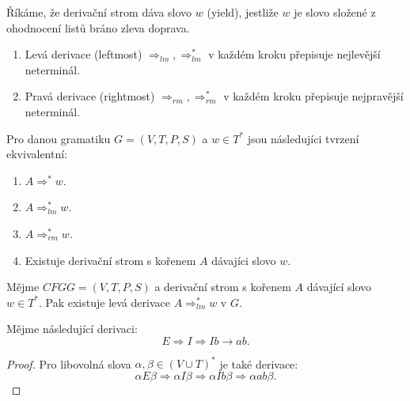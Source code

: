 \documentclass[../main.tex]{subfiles}
\begin{document}
\begin{definition}
    Říkáme, že derivační strom dáva slovo $w$ (yield), jestliže $w$ je slovo složené z ohodnocení listů bráno zleva doprava.
\end{definition}

\begin{definition}
    \begin{enumerate}
        \item Levá derivace (leftmost) $\Rightarrow_{lm}, \Rightarrow_{lm}^*$ v každém kroku přepisuje nejlevější neterminál.
        \item Pravá derivace (rightmost) $\Rightarrow_{rm}, \Rightarrow_{rm}^*$ v každém kroku přepisuje nejpravější neterminál.
    \end{enumerate}
\end{definition}

\begin{theorem}
    Pro danou gramatiku $G = (V,T,P,S)$ a $w\in T^*$ jsou následujíci tvrzení ekvivalentní:
    \begin{enumerate}
        \item $A \Rightarrow^* w$.
        \item $A \Rightarrow^*_{lm} w$.
        \item $A \Rightarrow^*_{rm} w$.
        \item Existuje derivační strom s kořenem $A$ dávajíci slovo $w$.
    \end{enumerate}
\end{theorem}

\begin{theorem}
    Mějme $CFG G = (V,T,P,S)$ a derivační strom s kořenem $A$ dávající slovo $w \in T^*$. Pak existuje
    levá derivace $A \Rightarrow^*_{lm} w $ v $G$.
\end{theorem}

\begin{lemma}
    Mějme následující derivaci:
    \[E \Rightarrow I \Rightarrow Ib \rightarrow ab.\]
\end{lemma}
\begin{proof}
    Pro libovolná slova $\alpha, \beta \in (V\cup T)^*$ je také derivace:
    \[\alpha E \beta \Rightarrow \alpha I \beta \Rightarrow \alpha Ib \beta \Rightarrow \alpha ab \beta.\]
\end{proof}
\end{document}
